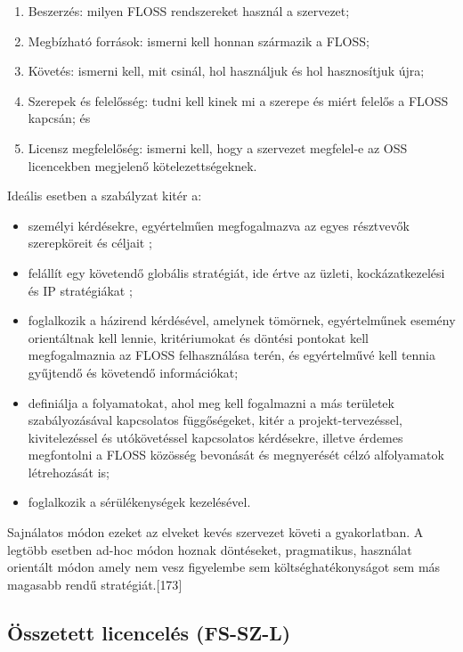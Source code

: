 \documentclass[12pt,magyar,a4paper,oneside]{scrreprt}
\providecommand{\tightlist}{%
  \setlength{\itemsep}{0pt}\setlength{\parskip}{0pt}}
\begin{document}
\begin{enumerate}
\def\labelenumi{\arabic{enumi}.}
\tightlist
\item
  Beszerzés: milyen FLOSS rendszereket használ a szervezet;
\item
  Megbízható források: ismerni kell honnan származik a FLOSS;
\item
  Követés: ismerni kell, mit csinál, hol használjuk és hol hasznosítjuk
  újra;
\item
  Szerepek és felelősség: tudni kell kinek mi a szerepe és miért felelős
  a FLOSS kapcsán; és
\item
  Licensz megfelelőség: ismerni kell, hogy a szervezet megfelel-e az OSS
  licencekben megjelenő kötelezettségeknek.
\end{enumerate}

Ideális esetben a szabályzat kitér a:

\begin{itemize}
\tightlist
\item
  személyi kérdésekre, egyértelműen megfogalmazva az egyes résztvevők
  szerepköreit és céljait ;
\item
  felállít egy követendő globális stratégiát, ide értve az üzleti,
  kockázatkezelési és IP stratégiákat ;
\item
  foglalkozik a házirend kérdésével, amelynek tömörnek, egyértelműnek
  esemény orientáltnak kell lennie, kritériumokat és döntési pontokat
  kell megfogalmaznia az FLOSS felhasználása terén, és egyértelművé kell
  tennia gyűjtendő és követendő információkat;
\item
  definiálja a folyamatokat, ahol meg kell fogalmazni a más területek
  szabályozásával kapcsolatos függőségeket, kitér a projekt-tervezéssel,
  kivitelezéssel és utókövetéssel kapcsolatos kérdésekre, illetve
  érdemes megfontolni a FLOSS közösség bevonását és megnyerését célzó
  alfolyamatok létrehozását is;
\item
  foglalkozik a sérülékenységek kezelésével.
\end{itemize}

Sajnálatos módon ezeket az elveket kevés szervezet követi a
gyakorlatban. A legtöbb esetben ad-hoc módon hoznak döntéseket,
pragmatikus, használat orientált módon amely nem vesz figyelembe sem
költséghatékonyságot sem más magasabb rendű stratégiát.{[}173{]}

\hypertarget{sec:FS-SZ-L}{%
\subsection{Összetett licencelés (FS-SZ-L)}\label{sec:FS-SZ-L}}
\end{document}
